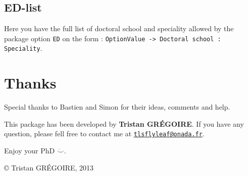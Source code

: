 \documentclass{scrartcl}
\newcommand*{\mail}[1]{\href{mailto:#1}{\texttt{#1}}}
\begin{document}
\subsection{ED-list\label{ssec:ED}}
Here you have the full list of doctoral school and speciality allowed by the package option \texttt{ED} on the form :
\texttt{OptionValue -> Doctoral school : Speciality}.



\section*{Thanks}
Special thanks to Bastien and Simon for their ideas, comments and help.

\noindent This package has been developed by \textbf{Tristan GR\'EGOIRE}.
If you have any question, please fell free to contact me at \mail{tlsflyleaf@onada.fr}.

\medskip
\noindent\smiley \hfill Enjoy your PhD $\ddot\smile$. \hfill \smiley

\bigskip
\hfill \copyright{} Tristan GR\'EGOIRE, 2013
\end{document}
